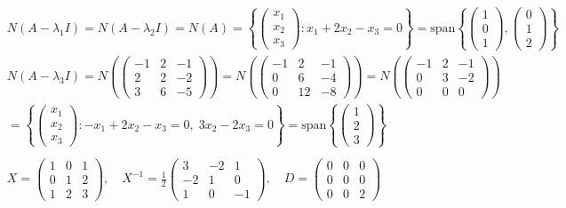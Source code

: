 \documentclass{article}
\begin{document}
\begin{align*}
    \\
    &N(A - \lambda_1 I) = N(A - \lambda_2 I) = N(A) 
    = \left\{ \begin{pmatrix} x_1 \\ x_2 \\ x_3 \end{pmatrix} : x_1 + 2x_2 - x_3 = 0 \right\} 
    = \text{span}\left\{ \begin{pmatrix} 1 \\ 0 \\ 1 \end{pmatrix}, \begin{pmatrix} 0 \\ 1 \\ 2 \end{pmatrix} \right\} \\
    &N(A - \lambda_3 I) = N\left(\begin{pmatrix} -1 & 2 & -1 \\ 2 & 2 & -2 \\ 3 & 6 & -5 \end{pmatrix}\right)
    = N\left(\begin{pmatrix} -1 & 2 & -1 \\ 0 & 6 & -4 \\ 0 & 12 & -8 \end{pmatrix}\right)
    = N\left(\begin{pmatrix} -1 & 2 & -1 \\ 0 & 3 & -2 \\ 0 & 0 & 0 \end{pmatrix}\right) \\
    &= \left\{ \begin{pmatrix} x_1 \\ x_2 \\ x_3 \end{pmatrix} : -x_1 + 2x_2 - x_3 = 0, \; 3x_2 - 2x_3 = 0 \right\}
    = \text{span}\left\{ \begin{pmatrix} 1 \\ 2 \\ 3 \end{pmatrix} \right\} \\
    \\
    &X = \begin{pmatrix} 1 & 0 & 1 \\ 0 & 1 & 2 \\ 1 & 2 & 3 \end{pmatrix} , \quad
    X^{-1} = \frac{1}{2} \begin{pmatrix} 3 & -2 & 1 \\ -2 & 1 & 0 \\ 1 & 0 & -1 \end{pmatrix} , \quad
    D = \begin{pmatrix} 0 & 0 & 0 \\ 0 & 0 & 0 \\ 0 & 0 & 2 \end{pmatrix} \\
\end{align*}
\end{document}
